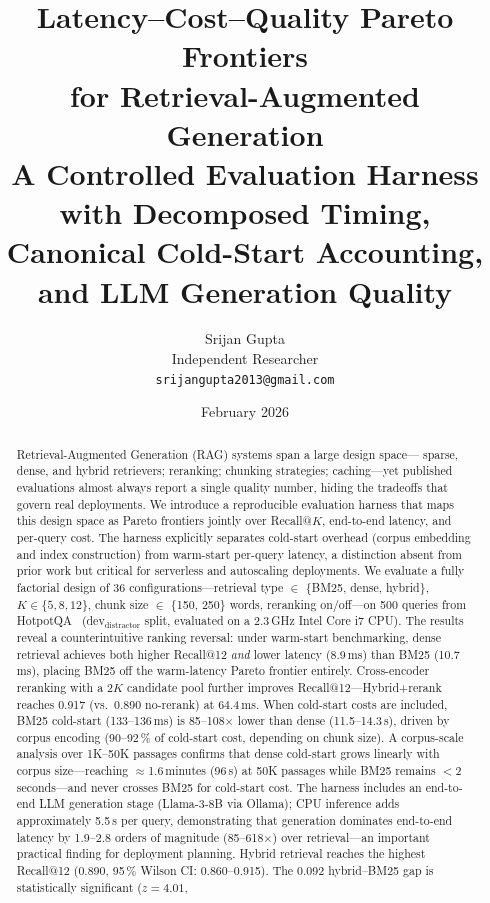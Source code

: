 \documentclass[11pt,a4paper]{article}
\title{\textbf{Latency--Cost--Quality Pareto Frontiers\\for Retrieval-Augmented Generation}\\[4pt]
\large A Controlled Evaluation Harness with Decomposed Timing,\\
Canonical Cold-Start Accounting, and LLM Generation Quality}
\author{
  Srijan Gupta\\
  Independent Researcher\\
  \texttt{srijangupta2013@gmail.com}
}
\date{February 2026}
\begin{document}
\maketitle

\begin{abstract}
Retrieval-Augmented Generation (RAG) systems span a large design space---%
sparse, dense, and hybrid retrievers; reranking; chunking strategies;
caching---yet published evaluations almost always report a single quality
number, hiding the tradeoffs that govern real deployments.
We introduce a reproducible evaluation harness that maps this design space as
Pareto frontiers jointly over Recall@$K$, end-to-end latency, and per-query
cost.
The harness explicitly separates cold-start overhead (corpus embedding and
index construction) from warm-start per-query latency, a distinction absent
from prior work but critical for serverless and autoscaling deployments.
We evaluate a fully factorial design of 36 configurations---retrieval type
$\in$ \{BM25, dense, hybrid\}, $K \in \{5, 8, 12\}$, chunk size $\in$
\{150, 250\} words, reranking on/off---on 500 queries from
HotpotQA~\citep{yang2018hotpotqa} (dev$_{\text{distractor}}$ split,
evaluated on a 2.3\,GHz Intel Core i7 CPU).
The results reveal a counterintuitive ranking reversal:
under warm-start benchmarking, dense retrieval achieves both higher Recall@12
\emph{and} lower latency (8.9\,ms) than BM25 (10.7\,ms), placing BM25
off the warm-latency Pareto frontier entirely.
Cross-encoder reranking with a $2K$ candidate pool further improves
Recall@12---Hybrid+rerank reaches 0.917 (vs.\ 0.890 no-rerank) at 64.4\,ms.
When cold-start costs are included, BM25 cold-start (133--136\,ms) is
85--108$\times$ lower than dense (11.5--14.3\,s), driven by corpus encoding
(90--92\,\% of cold-start cost, depending on chunk size).
A corpus-scale analysis over 1K--50K passages confirms that dense cold-start
grows linearly with corpus size---reaching $\approx$1.6\,minutes (96\,s) at 50K passages
while BM25 remains $<$2\,seconds---and never crosses BM25 for cold-start cost.
The harness includes an end-to-end LLM generation stage (Llama-3-8B via
Ollama); CPU inference adds approximately 5.5\,s per query, demonstrating that
generation dominates end-to-end latency by 1.9--2.8 orders of magnitude
(85--618$\times$) over retrieval---an important practical finding for
deployment planning.
Hybrid retrieval reaches the highest Recall@12 (0.890, 95\,\% Wilson CI:
0.860--0.915).
The 0.092 hybrid--BM25 gap is statistically significant ($z\!=\!4.01$,

\end{abstract}
\end{document}
